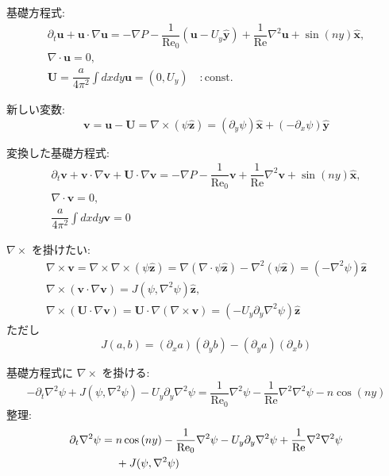 \documentclass[12pt, a4j]{jsarticle}
\newcommand{\p}{\partial}
\renewcommand{\Re}{\mathrm{Re}}
\begin{document}
基礎方程式:
\begin{gather}
    \p_{t} \bm{u} 
    + \bm{u} \cdot \nabla \bm{u}
    = - \nabla P 
      - \dfrac{1}{\Re_{0}} (\bm{u} - U_{y} \hat{\bm{y}})
      + \dfrac{1}{\Re} \nabla^{2} \bm{u}
      + \sin{(n y)} \hat{\bm{x}},
    \\
    \nabla \cdot \bm{u}
    = 0,
    \\
    \bm{U}
    = \dfrac{a}{4 \pi^{2}} \int dxdy \bm{u}
    = (0, U_{y})
    \quad : \text{const.}
\end{gather}

新しい変数:
\begin{equation}
    \bm{v} 
    = \bm{u} - \bm{U}
    = \nabla \times (\psi \hat{\bm{z}})
    = (\p_{y} \psi) \hat{\bm{x}}
      + (- \p_{x} \psi) \hat{\bm{y}}
\end{equation}

変換した基礎方程式:
\begin{gather}
    \p_{t} \bm{v} 
    + \bm{v} \cdot \nabla \bm{v}
    + \bm{U} \cdot \nabla \bm{v}
    = - \nabla P 
      - \dfrac{1}{\Re_{0}} \bm{v}
      + \dfrac{1}{\Re} \nabla^{2} \bm{v}
      + \sin{(n y)} \hat{\bm{x}},
    \\
    \nabla \cdot \bm{v}
    = 0,
    \\
    \dfrac{a}{4 \pi^{2}} \int dxdy \bm{v}
    = 0
\end{gather}

$\nabla \times$ を掛けたい:
\begin{gather}
    \nabla \times \bm{v}
    = \nabla \times \nabla \times (\psi \hat{\bm{z}})
    = \nabla (\nabla \cdot \psi \hat{\bm{z}})
      - \nabla^{2} (\psi \hat{\bm{z}})
    = (- \nabla^{2} \psi) \hat{\bm{z}}
    \\
    \nabla \times (\bm{v} \cdot \nabla \bm{v})
    = J(\psi, \nabla^{2} \psi) \hat{\bm{z}},
    \\
    \nabla \times (\bm{U} \cdot \nabla \bm{v})
    = \bm{U} \cdot \nabla (\nabla \times \bm{v})
    = (- U_{y} \p_{y} \nabla^{2} \psi) \hat{\bm{z}}
\end{gather}
ただし
\begin{equation}
    J(a, b)
    = (\p_{x} a) (\p_{y} b) - (\p_{y} a) (\p_{x} b)
\end{equation}

基礎方程式に $\nabla \times$ を掛ける:
\begin{equation}
    - \p_{t} \nabla^{2} \psi
    + J(\psi, \nabla^{2} \psi)
    - U_{y} \p_{y} \nabla^{2} \psi
    = \dfrac{1}{\Re_{0}} \nabla^{2} \psi
      - \dfrac{1}{\Re} \nabla^{2} \nabla^{2} \psi
      - n \cos{(n y)}
\end{equation}
整理:
\begin{align}
    \p_{t} \nabla^{2} \psi
    &= n \cos{(n y)}
       - \dfrac{1}{\Re_{0}} \nabla^{2} \psi
       - U_{y} \p_{y} \nabla^{2} \psi
       + \dfrac{1}{\Re} \nabla^{2} \nabla^{2} \psi \\
    &\hphantom{{}={}}
       + J(\psi, \nabla^{2} \psi)
\end{align}
\end{document}
